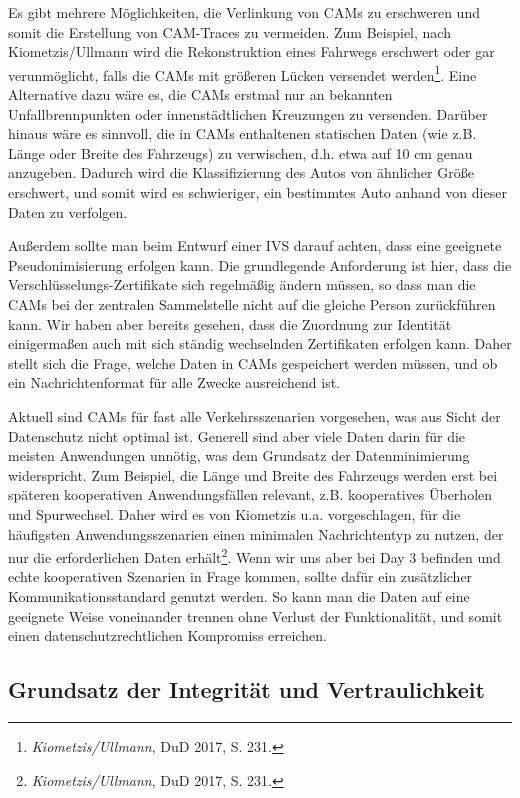 Es gibt mehrere Möglichkeiten, die Verlinkung von CAMs zu erschweren und somit die Erstellung von CAM-Traces zu vermeiden. Zum Beispiel, nach Kiometzis/Ullmann wird die Rekonstruktion eines Fahrwegs erschwert oder gar verunmöglicht, falls die CAMs mit größeren Lücken versendet werden\footnote{\emph{Kiometzis/Ullmann}, DuD 2017, S. 231.}. Eine Alternative dazu wäre es, die CAMs erstmal nur an bekannten Unfallbrennpunkten oder innenstädtlichen Kreuzungen zu versenden. Darüber hinaus wäre es sinnvoll, die in CAMs enthaltenen statischen Daten (wie z.B. Länge oder Breite des Fahrzeugs) zu verwischen, d.h. etwa auf 10 cm genau anzugeben. Dadurch wird die Klassifizierung des Autos von ähnlicher Größe erschwert, und somit wird es schwieriger, ein bestimmtes Auto anhand von dieser Daten zu verfolgen. 

Außerdem sollte man beim Entwurf einer IVS darauf achten, dass eine geeignete Pseudonimisierung erfolgen kann. Die grundlegende Anforderung ist hier, dass die Verschlüsselungs-Zertifikate sich regelmäßig ändern müssen, so dass man die CAMs bei der zentralen Sammelstelle nicht auf die gleiche Person zurückführen kann. Wir haben aber bereits gesehen, dass die Zuordnung zur Identität einigermaßen auch mit sich ständig wechselnden Zertifikaten erfolgen kann. Daher stellt sich die Frage, welche Daten in CAMs gespeichert werden müssen, und ob ein Nachrichtenformat für alle Zwecke ausreichend ist.

Aktuell sind CAMs für fast alle Verkehrsszenarien vorgesehen, was aus Sicht der Datenschutz nicht optimal ist. Generell sind aber viele Daten darin für die meisten Anwendungen unnötig, was dem Grundsatz der Datenminimierung widerspricht. Zum Beispiel, die Länge und Breite des Fahrzeugs werden erst bei späteren kooperativen Anwendungsfällen relevant, z.B. kooperatives Überholen und Spurwechsel. Daher wird es von Kiometzis u.a. vorgeschlagen, für die häufigsten Anwendungsszenarien einen minimalen Nachrichtentyp zu nutzen, der nur die erforderlichen Daten erhält\footnote{\emph{Kiometzis/Ullmann}, DuD 2017, S. 231.}. Wenn wir uns aber bei Day 3 befinden und echte kooperativen Szenarien in Frage kommen, sollte dafür ein zusätzlicher Kommunikationsstandard genutzt werden. So kann man die Daten auf eine geeignete Weise voneinander trennen ohne Verlust der Funktionalität, und somit einen datenschutzrechtlichen Kompromiss erreichen.

\subsection{Grundsatz der Integrität und Vertraulichkeit}

